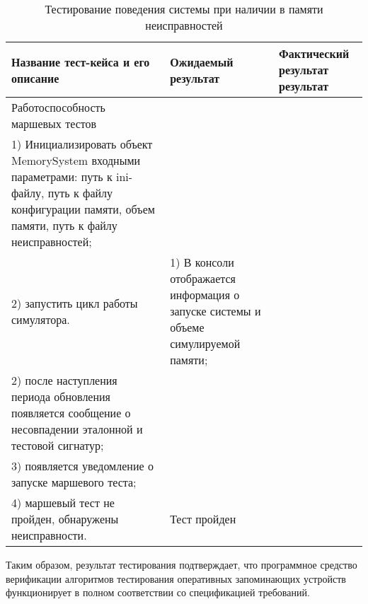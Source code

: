 \begin{longtable}[p]{| >{\raggedright}p{}                     
                     | >{\raggedright}p{}
                     | >{\raggedright\arraybackslash}p{}|}
  \caption{Тестирование поведения системы при наличии в памяти неисправностей}
  \label{sec:testing:march_testing} \tabularnewline

  \hline
      Название тест-кейса и его описание & Ожидаемый результат & Фактический результат результат \\
   \hline
   Работоспособность маршевых тестов\\ 
   1) Инициализировать объект MemorySystem входными параметрами: путь к ini-файлу, путь к файлу конфигурации памяти, объем памяти, путь к файлу неисправностей; \\
   2) запустить цикл работы симулятора.

   &
   1) В консоли отображается информация о запуске системы и объеме симулируемой памяти;\\
   2) после наступления периода обновления появляется сообщение о несовпадении эталонной и тестовой сигнатур;\\
   3) появляется уведомление о запуске маршевого теста;\\
   4) маршевый тест не пройден, обнаружены неисправности.

   &
   Тест пройден \\
   \hline
\end{longtable}

Таким образом, результат тестирования подтверждает, что программное средство верификации алгоритмов тестирования оперативных запоминающих устройств функционирует в полном соответствии со спецификацией требований.